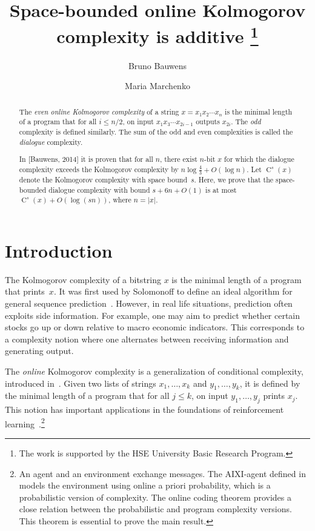 \documentclass[runningheads]{llncs}
\title{Space-bounded online Kolmogorov complexity is additive
   \thanks{%
     The work is supported by the HSE University Basic Research Program.}
   }
\author{Bruno Bauwens\inst{1}\orcidID{0000-0002-6138-0591} \and Maria Marchenko\inst{2}}
\institute{HSE University, Faculty of Computer Science, Moscow, 101000, Russia \email{brbauwens@gmail.com}\\ 
  \and University of Amsterdam, Amsterdam, Netherlands \email{maria.m.m.marchenko@gmail.com}
  }
\DeclareMathOperator{\C}{C} \newcommand{\Cev}{\C_\textnormal{ev}} \newcommand{\Codd}{\C_\textnormal{odd}}
\begin{document}
\maketitle
  
\begin{abstract}
  The {\em even online Kolmogorov complexity} of a string $x = x_1 x_2 \cdots x_{n}$ is the minimal length of a program that for all $i\le n/2$, 
  on input $x_1x_3 \cdots x_{2i-1}$ outputs $x_{2i}$. The {\em odd} complexity is defined similarly. 
  The sum of the odd and even complexities is called the {\em dialogue} complexity. 

  In [Bauwens, 2014] it is proven that for all $n$, there exist $n$-bit $x$ for which the dialogue complexity exceeds the Kolmogorov complexity by $n\log \frac 4 3 + O(\log n)$. 
  Let $\C^s(x)$ denote the Kolmogorov complexity with space bound~$s$. 
  Here, we prove that the space-bounded dialogue complexity with bound $s + 6n + O(1)$ is at most $\C^{s}(x) + O(\log (sn))$, where $n=|x|$. 
\end{abstract}



\section{Introduction}

The Kolmogorov complexity of a bitstring $x$ is the minimal length of a program that prints~$x$. 
It was first used by Solomonoff to define an ideal algorithm for general sequence prediction~\cite{SolomonoffI,SolomonoffII,Solomonoff1960}. 
However, in real life situations, prediction often exploits side information. 
For example, one may aim to predict whether certain stocks go up or down relative to macro economic indicators. 
This corresponds to a complexity notion where one alternates between receiving information and generating output. 

The  {\em online} Kolmogorov complexity is a generalization of conditional complexity, introduced in~\cite{onlineComplexity}. 
Given two lists of strings $x_1, \ldots, x_k$ and $y_1, \ldots, y_k$, it is defined by the minimal length of a program that for all $j \le k$, 
on input $y_1, \ldots, y_j$ prints $x_j$. 
This notion has important applications in the foundations of reinforcement learning~\cite{Hutter2005universal,Hutter2024book}.\footnote{
  An agent and an environment exchange messages. The AIXI-agent defined in \cite{Hutter2005universal,Hutter2024book} models the environment using online a priori probability, 
  which is a probabilistic version of complexity. 
  The online coding theorem provides a close relation between the probabilistic and program complexity versions. 
  This theorem is essential to prove the main result. 
}
\end{document}
